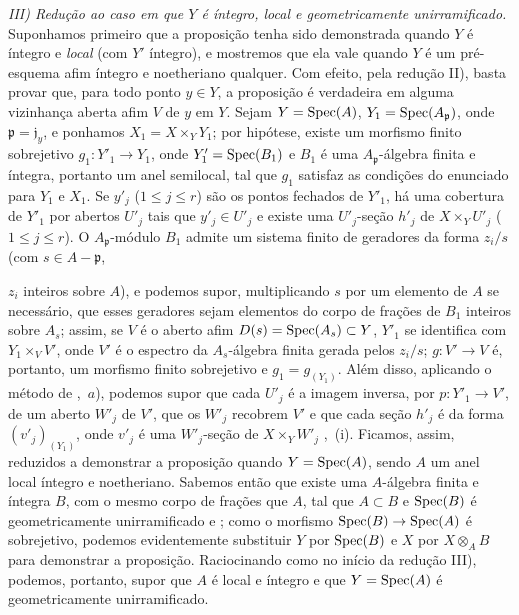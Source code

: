 \emph{III) Redução ao caso em que $Y$ é íntegro, local e geometricamente unirramificado.}
Suponhamos primeiro que a proposição tenha sido demonstrada quando $Y$ é íntegro e \emph{local} (com $Y'$ íntegro), e mostremos que ela vale quando $Y$ é um pré-esquema afim íntegro e noetheriano qualquer.
Com efeito, pela redução II), basta provar que, para todo ponto $y\in Y$, a proposição é verdadeira em alguma vizinhança aberta afim $V$ de $y$ em $Y$.
Sejam $Y=\operatorname{Spec}(A)$, $Y_1=\operatorname{Spec}(A_{\mathfrak p})$, onde $\mathfrak p=\mathfrak j_y$, e ponhamos $X_1=X\times_Y Y_1$; por hipótese, existe um morfismo finito sobrejetivo $g_1:Y'_1\to Y_1$, onde $Y'_1=\operatorname{Spec}(B_1)$ e $B_1$ é uma $A_{\mathfrak p}$-álgebra finita e íntegra, portanto um anel semilocal, tal que $g_1$ satisfaz as condições do enunciado para $Y_1$ e $X_1$.
Se $y'_j$ ($1\leq j\leq r$) são os pontos fechados de $Y'_1$, há uma cobertura de $Y'_1$ por abertos $U'_j$ tais que $y'_j\in U'_j$ e existe uma $U'_j$-seção $h'_j$ de $X\times_Y U'_j$ ($1\leq j\leq r$).
O $A_{\mathfrak p}$-módulo $B_1$ admite um sistema finito de geradores da forma $z_i/s$ (com $s\in A-\mathfrak p$,


$z_i$ inteiros sobre $A$), e podemos supor, multiplicando $s$ por um elemento de $A$ se necessário, que esses geradores sejam elementos do corpo de frações de $B_1$ inteiros sobre $A_s$; assim, se $V$ é o aberto afim $D(s)=\operatorname{Spec}(A_s)\subset Y$, $Y'_1$ se identifica com $Y_1\times_V V'$, onde $V'$ é o espectro da $A_s$-álgebra finita gerada pelos $z_i/s$; $g:V'\to V$ é, portanto, um morfismo finito sobrejetivo e $g_1=g_{(Y_1)}$.
Além disso, aplicando o método de ,~$a$), podemos supor que cada $U'_j$ é a imagem inversa, por $p:Y'_1\to V'$, de um aberto $W'_j$ de $V'$, que os $W'_j$ recobrem $V'$  e que cada seção $h'_j$ é da forma $(v'_j)_{(Y_1)}$, onde $v'_j$ é uma $W'_j$-seção de $X\times_Y W'_j$ ,~(i).
Ficamos, assim, reduzidos a demonstrar a proposição quando $Y=\operatorname{Spec}(A)$, sendo $A$ um anel local íntegro e noetheriano.
Sabemos então que existe uma $A$-álgebra finita e íntegra $B$, com o mesmo corpo de frações que $A$, tal que $A\subset B$ e $\operatorname{Spec}(B)$ é geometricamente unirramificado  e ; como o morfismo $\Spec(B)\to\Spec(A)$ é sobrejetivo, podemos evidentemente substituir $Y$ por $\operatorname{Spec}(B)$ e $X$ por $X\otimes_A B$ para demonstrar a proposição.
Raciocinando como no início da redução III), podemos, portanto, supor que $A$ é local e íntegro e que $Y=\operatorname{Spec}(A)$ é geometricamente unirramificado.

